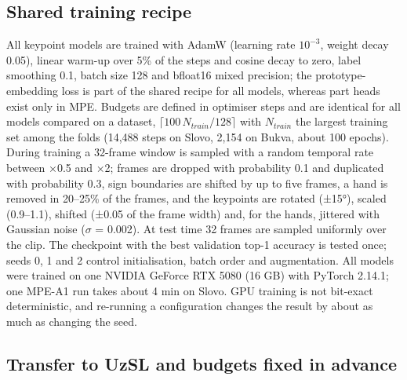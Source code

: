 \hypertarget{shared-training-recipe}{%
\subsection{Shared training recipe}\label{shared-training-recipe}}

All keypoint models are trained with AdamW (learning rate \(10^{-3}\), weight decay 0.05), linear warm-up over 5\% of the steps and cosine decay to zero, label smoothing 0.1, batch size 128 and bfloat16 mixed precision; the prototype-embedding loss is part of the shared recipe for all models, whereas part heads exist only in MPE. Budgets are defined in optimiser steps and are identical for all models compared on a dataset, \(\lceil 100\,N_{train}/128 \rceil\) with \(N_{train}\) the largest training set among the folds (14,488 steps on Slovo, 2,154 on Bukva, about 100 epochs). During training a 32-frame window is sampled with a random temporal rate between ×0.5 and ×2; frames are dropped with probability 0.1 and duplicated with probability 0.3, sign boundaries are shifted by up to five frames, a hand is removed in 20--25\% of the frames, and the keypoints are rotated (±15°), scaled (0.9--1.1), shifted (±0.05 of the frame width) and, for the hands, jittered with Gaussian noise (\(\sigma\) = 0.002). At test time 32 frames are sampled uniformly over the clip. The checkpoint with the best validation top-1 accuracy is tested once; seeds 0, 1 and 2 control initialisation, batch order and augmentation. All models were trained on one NVIDIA GeForce RTX 5080 (16 GB) with PyTorch 2.14.1; one MPE-A1 run takes about 4 min on Slovo. GPU training is not bit-exact deterministic, and re-running a configuration changes the result by about as much as changing the seed.

\hypertarget{transfer-to-uzsl-and-budgets-fixed-in-advance}{%
\subsection{Transfer to UzSL and budgets fixed in advance}\label{transfer-to-uzsl-and-budgets-fixed-in-advance}}

